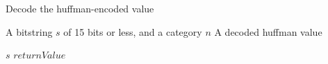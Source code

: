 \begin{algorithm}
\caption{Decode the huffman-encoded value}
\label{algDecodeHuffmanValue}
\begin{algorithmic}
\REQUIRE A bitstring $s$ of 15 bits or less, and a category $n$
\ENSURE A decoded huffman value

	\RETURN $s$
\ENDIF
{}
\RETURN $returnValue$
\end{algorithmic}
\end{algorithm}
